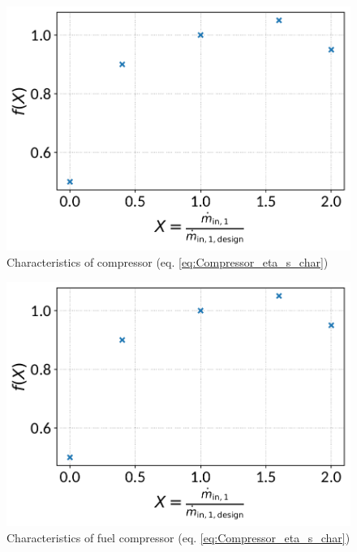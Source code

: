 \begin{minipage}{0.5\textwidth}
\begin{figure}[H]\begin{center}
\includegraphics[width=\textwidth]{figures/Compressor_CharLine_eta_s_char_compressor.pdf}
\caption{Characteristics of compressor (eq. \ref{eq:Compressor_eta_s_char})}
\label{fig:CharLine_eta_s_char_compressor}
\end{center}\end{figure}

\end{minipage}
\begin{minipage}{0.5\textwidth}
\begin{figure}[H]\begin{center}
\includegraphics[width=\textwidth]{figures/Compressor_CharLine_eta_s_char_fuel_compressor.pdf}
\caption{Characteristics of fuel compressor (eq. \ref{eq:Compressor_eta_s_char})}
\label{fig:CharLine_eta_s_char_fuel compressor}
\end{center}\end{figure}

\end{minipage}



